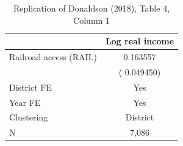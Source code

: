 \begin{table}[htbp]
\centering
\caption{Replication of Donaldson (2018), Table 4, Column 1}
\label{tab:donaldson_t4c1}
\begin{tabular}{lc}
\hline\hline
 & Log real income \\
\hline
Railroad access (RAIL) &     0.163557 \\
 & (    0.049450) \\
\hline
District FE & Yes \\
Year FE & Yes \\
Clustering & District \\
N &     7,086 \\
\hline\hline
\end{tabular}
\end{table}
